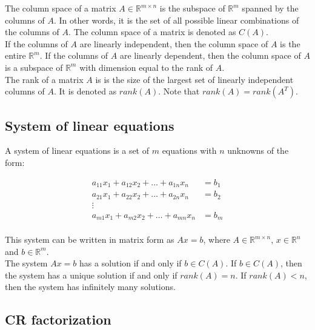 The column space of a matrix $A \in \mathbb{R}^{m \times n}$ is the subspace of $\mathbb{R}^m$ spanned by the columns of $A$.
In other words, it is the set of all possible linear combinations of the columns of $A$. The column space of a matrix is denoted
as $C(A)$.\\

If the columns of $A$ are linearly independent, then the column space of $A$ is the entire $\mathbb{R}^m$. If the columns of $A$
are linearly dependent, then the column space of $A$ is a subspace of $\mathbb{R}^m$ with dimension equal to the rank of $A$.\\

The rank of a matrix $A$ is is the size of the largest set of linearly independent columns of $A$. It is denoted as $rank(A)$.
Note that $rank(A) = rank(A^T)$.

\subsection{System of linear equations}

A system of linear equations is a set of $m$ equations with $n$ unknowns of the form:

\begin{equation}
    \begin{aligned}
        a_{11} x_1 + a_{12} x_2 + \ldots + a_{1n} x_n &= b_1 \\
        a_{21} x_1 + a_{22} x_2 + \ldots + a_{2n} x_n &= b_2 \\
        \vdots \\
        a_{m1} x_1 + a_{m2} x_2 + \ldots + a_{mn} x_n &= b_m \\
    \end{aligned}
\end{equation}

This system can be written in matrix form as $Ax = b$, where $A \in \mathbb{R}^{m \times n}$, $x \in \mathbb{R}^n$ 
and $b \in \mathbb{R}^m$.\\

The system $Ax = b$ has a solution if and only if $b \in C(A)$. If $b \in C(A)$, then the system has a unique solution
if and only if $rank(A) = n$. If $rank(A) < n$, then the system has infinitely many solutions.

\subsection{CR factorization}


